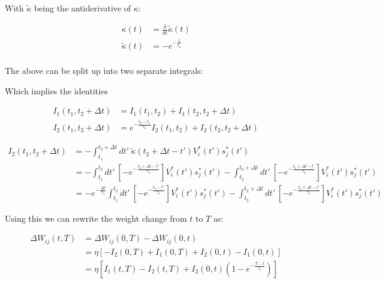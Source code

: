 With $\tilde{\kappa}$ being the antiderivative of $\kappa$:

\begin{align}
  \kappa(t)         & = \frac{\delta}{\delta t} \tilde{\kappa}(t) \\
  \tilde{\kappa}(t) & = - e^{-\frac{t}{t_{\kappa}}}               \\
\end{align}

The above can be split up into two separate integrals:

Which implies the identities

\begin{align}
  I_1(t_1, t_2 + \Delta t) & = I_1 (t_1, t_2) + I_1 (t_2, t_2 + \Delta t)                                       \\
  I_2(t_1, t_2 + \Delta t) & = e^{- \frac{t_2 - t_1}{\tau_{\kappa}}} I_2 (t_1, t_2) + I_2 (t_2, t_2 + \Delta t)
\end{align}


\begin{align}
  I_2 (t_1, t_2 + \Delta t) & = -\int_{t_1}^{t_2 + \Delta t} dt' \ \tilde{\kappa} (t_2 + \Delta t - t') V_i^\ast (t') s_j^\ast (t')                                        \\
                            & = -\int_{t_1}^{t_2} dt' \ \left[ -e^{- \frac{t_2 + \Delta t - t'}{\tau_\kappa}} \right] V_i^\ast (t') s_j^\ast (t')
  -\int_{t_2}^{t_2 + \Delta t} dt' \ \left[ -e^{- \frac{t_2 + \Delta t - t'}{\tau_\kappa}} \right] V_i^\ast (t') s_j^\ast (t')                                             \\
                            & = -e^{- \frac{ \Delta t}{\tau_\kappa}} \int_{t_1}^{t_2} dt' \ \left[ -e^{- \frac{t_2 - t'}{\tau_\kappa}} \right] V_i^\ast (t') s_j^\ast (t')
  -\int_{t_2}^{t_2 + \Delta t} dt' \ \left[ -e^{- \frac{t_2 + \Delta t - t'}{\tau_\kappa}} \right] V_i^\ast (t') s_j^\ast (t')
\end{align}


Using this we can rewrite the weight change from $t$ to $T$ as:


\begin{align}
  \Delta W_{ij}(t,T) & = \Delta W_{ij}(0,T) - \Delta W_{ij}(0,t)                                               \\
                     & = \eta [-I_2(0,T) + I_1(0,T) + I_2(0,t) - I_1(0,t)]                                     \\
                     & = \eta [I_1(t,T) - I_2(t,T) + I_2(0,t)\left( 1 - e^{- \frac{T-t}{\tau_\kappa}} \right)]
\end{align}

